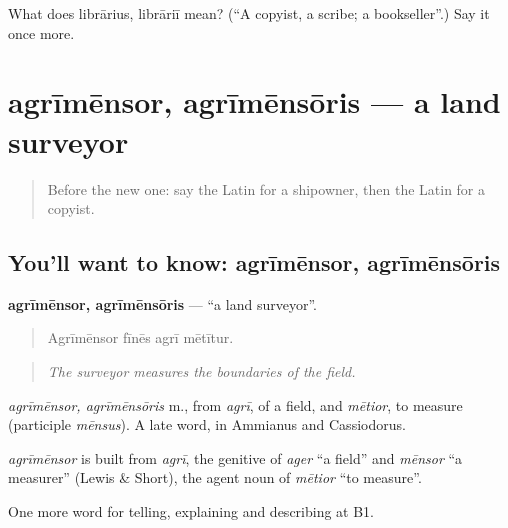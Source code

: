 \begin{tcolorbox}[breakable,colback=teal!4,colframe=teal!35!black,title={Before you move on}]
What does librārius, librāriī mean? (\textquotedblleft{}A copyist, a scribe; a bookseller\textquotedblright{}.) Say it once more.
\end{tcolorbox}
\section[agrīmēnsor, agrīmēnsōris]{agrīmēnsor, agrīmēnsōris — a land surveyor}

\label{lesson:LA-C381-agrimensor}



\begin{quote}
Before the new one: say the Latin for a shipowner, then the Latin for a copyist.
\end{quote}

\subsection*{You'll want to know: agrīmēnsor, agrīmēnsōris}
\textbf{agrīmēnsor, agrīmēnsōris} — \textquotedblleft{}a land surveyor\textquotedblright{}.

\begin{quote}
Agrīmēnsor fīnēs agrī mētītur.
\end{quote}

\begin{quote}
\emph{The surveyor measures the boundaries of the field.}
\end{quote}

\emph{agrīmēnsor, agrīmēnsōris} m., from \emph{agrī}, of a field, and \emph{mētior}, to measure (participle \emph{mēnsus}). A late word, in Ammianus and Cassiodorus.

\begin{cousinweb}
\emph{agrīmēnsor} is built from \emph{agrī}, the genitive of \emph{ager} \textquotedblleft{}a field\textquotedblright{} and \emph{mēnsor} \textquotedblleft{}a measurer\textquotedblright{} (Lewis \& Short), the agent noun of \emph{mētior} \textquotedblleft{}to measure\textquotedblright{}.
\end{cousinweb}

\begin{grammarlens}[title={What you've built}]
One more word for telling, explaining and describing at B1.
\end{grammarlens}

